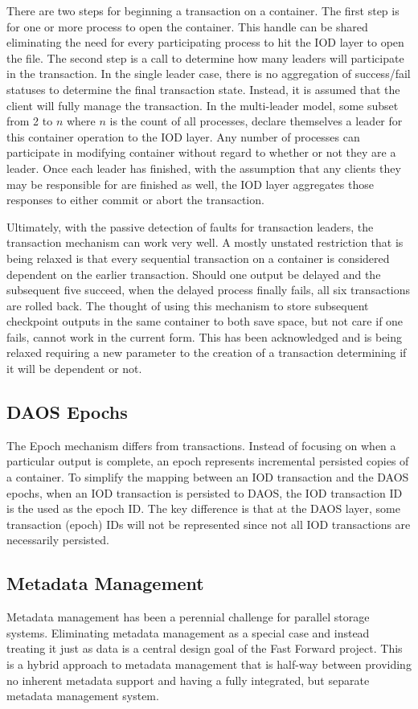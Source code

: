 \documentclass[conference]{IEEEtran}
\begin{document}
There are two steps for beginning a transaction on a container. The first step
is for one or more process to open the container. This handle can be shared
eliminating the need for every participating process to hit the IOD layer to
open the file. The second step is a call to determine how many leaders will
participate in the transaction. In the single leader case, there is no
aggregation of success/fail statuses to determine the final transaction state.
Instead, it is assumed that the client will fully manage the transaction. In
the multi-leader model, some subset from 2 to $n$ where $n$ is the count of all
processes, declare themselves a leader for this container operation to the IOD
layer. Any number of processes can participate in modifying container without
regard to whether or not they are a leader. Once each leader has finished, with
the assumption that any clients they may be responsible for are finished as
well, the IOD layer aggregates those responses to either commit or abort the
transaction.

Ultimately, with the passive detection of faults for transaction leaders, the
transaction mechanism can work very well. A mostly unstated restriction that is
being relaxed is that every sequential transaction on a container is considered
dependent on the earlier transaction. Should one output be delayed and the
subsequent five succeed, when the delayed process finally fails, all six
transactions are rolled back. The thought of using this mechanism to store
subsequent checkpoint outputs in the same container to both save space, but not
care if one fails, cannot work in the current form. This has been acknowledged
and is being relaxed requiring a new parameter to the creation of a transaction
determining if it will be dependent or not.

\subsection{DAOS Epochs}
The Epoch mechanism differs from transactions. Instead of focusing on when a
particular output is complete, an epoch represents incremental persisted copies
of a container. To simplify the mapping between an IOD transaction and the DAOS
epochs, when an IOD transaction is persisted to DAOS, the IOD transaction ID is
the used as the epoch ID. The key difference is that at the DAOS layer, some
transaction (epoch) IDs will not be represented since not all IOD transactions
are necessarily persisted.

\subsection{Metadata Management}
Metadata management has been a perennial challenge for parallel storage
systems.  Eliminating metadata management as a special case and instead
treating it just as data is a central design goal of the Fast Forward project.
This is a hybrid approach to metadata management that is half-way between
providing no inherent metadata support and having a fully integrated, but
separate metadata management system.
\end{document}
